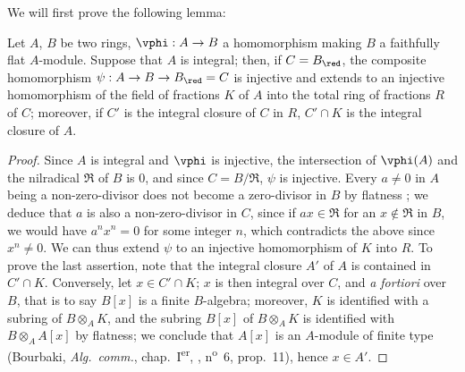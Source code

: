 We will first prove the following lemma:

\begin{lemma}[23.2.7.1]
\label{0.23.2.7.1}
Let $A$, $B$ be two rings, $\vphi:A\to B$ a homomorphism making $B$ a faithfully flat $A$-module.
Suppose that $A$ is integral; then, if $C=B_\red$, the composite homomorphism $\psi:A\to B\to B_\red=C$ is injective and extends to an injective homomorphism of the field of fractions $K$ of $A$ into the total ring of fractions $R$ of $C$; moreover, if $C'$ is the integral closure of $C$ in $R$, $C'\cap K$ is the integral closure of $A$.
\end{lemma}

\begin{proof}
Since $A$ is integral and $\vphi$ is injective, the intersection of $\vphi(A)$ and the nilradical $\mathfrak{R}$ of $B$ is $0$, and since $C=B/\mathfrak{R}$, $\psi$ is injective.
Every $a\neq 0$ in $A$ being a non-zero-divisor does not become a zero-divisor in $B$ by flatness ; we deduce that $a$ is also a non-zero-divisor in $C$, since if $ax\in\mathfrak{R}$ for an $x\notin\mathfrak{R}$ in $B$, we would have $a^nx^n=0$ for some integer $n$, which contradicts the above since $x^n\neq 0$.
We can thus extend $\psi$ to an injective homomorphism of $K$ into $R$.
To prove the last assertion, note that the integral closure $A'$ of $A$ is contained in $C'\cap K$.
Conversely, let $x\in C'\cap K$; $x$ is then integral over $C$, and \emph{a fortiori} over $B$, that is to say $B[x]$ is a finite $B$-algebra; moreover, $K$ is identified with a subring of $B\otimes_A K$, and the subring $B[x]$ of $B\otimes_A K$ is identified with $B\otimes_A A[x]$ by flatness; we conclude that $A[x]$ is an $A$-module of finite type (Bourbaki, \emph{Alg.~comm.}, chap.~I\textsuperscript{er}, , n\textsuperscript{o}~6, prop.~11), hence $x\in A'$.
\end{proof}

